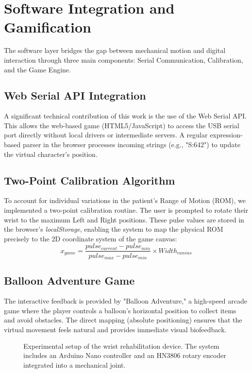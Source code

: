 \documentclass[conference]{IEEEtran}
\begin{document}
  \section{Software Integration and Gamification}

  The software layer bridges the gap between mechanical motion and digital interaction through three main components: Serial Communication, Calibration, and the Game Engine.

  \subsection{Web Serial API Integration}
  A significant technical contribution of this work is the use of the Web Serial API. This allows the web-based game (HTML5/JavaScript) to access the USB serial port directly without local drivers or intermediate servers. A regular expression-based parser in the browser processes incoming strings (e.g., "S:642") to update the virtual character's position.

  \subsection{Two-Point Calibration Algorithm}
  To account for individual variations in the patient's Range of Motion (ROM), we implemented a two-point calibration routine. The user is prompted to rotate their wrist to the maximum Left and Right positions. These pulse values are stored in the browser's \textit{localStorage}, enabling the system to map the physical ROM precisely to the 2D coordinate system of the game canvas:
  \begin{equation}
    x_{game} = \frac{pulse_{current} - pulse_{min}}{pulse_{max} - pulse_{min}} \times Width_{canvas}
  \end{equation}

  \subsection{Balloon Adventure Game}
  The interactive feedback is provided by "Balloon Adventure," a high-speed arcade game where the player controls a balloon's horizontal position to collect items and avoid obstacles. The direct mapping (absolute positioning) ensures that the virtual movement feels natural and provides immediate visual biofeedback.

  \begin{figure}[!ht]
      \centering
      \caption{Experimental setup of the wrist rehabilitation device. The system includes an Arduino Nano controller and an HN3806 rotary encoder integrated into a mechanical joint.}
      \label{fig:setup}
  \end{figure}
\end{document}

